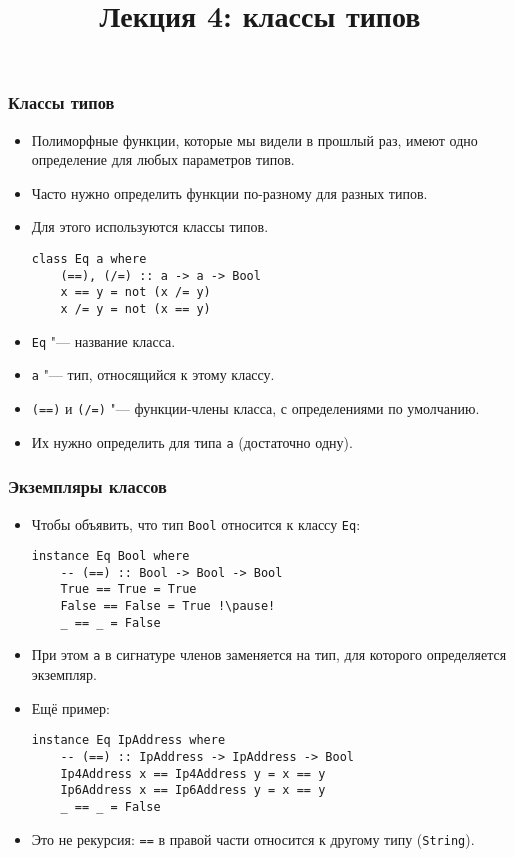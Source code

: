 \documentclass[10pt]{beamer}
\title{Лекция 4: классы типов}
\begin{document}
\begin{frame}[plain]
  \maketitle
\end{frame}

\begin{frame}[fragile]
  \frametitle{Классы типов}
  \begin{itemize}
    \item Полиморфные функции, которые мы видели в прошлый раз, имеют одно определение для любых параметров типов.
    \item Часто нужно определить функции по-разному для разных типов.
    \item Для этого используются классы типов.
          \begin{lstlisting}[basicstyle=\ttfamily\small]
class Eq a where
    (==), (/=) :: a -> a -> Bool
    x == y = not (x /= y)
    x /= y = not (x == y)
\end{lstlisting}
    \item \lstinline|Eq| "--- название класса.
    \item \lstinline|a| "--- тип, относящийся к этому классу.
    \item \lstinline|(==)| и \lstinline|(/=)| "--- функции-члены класса, с определениями по умолчанию.
    \item Их нужно определить для типа \lstinline|a| \pause(достаточно одну).
  \end{itemize}
\end{frame}

\begin{frame}[fragile]
  \frametitle{Экземпляры классов}
  \begin{itemize}
    \item Чтобы объявить, что тип \lstinline|Bool| относится к классу \lstinline|Eq|:
          \begin{lstlisting}[basicstyle=\ttfamily\small]
instance Eq Bool where
    -- (==) :: Bool -> Bool -> Bool
    True == True = True
    False == False = True !\pause!
    _ == _ = False
\end{lstlisting}
    \item При этом \lstinline|a| в сигнатуре членов заменяется на тип, для которого определяется экземпляр.
    \item Ещё пример:\pause
          \begin{lstlisting}[basicstyle=\ttfamily\small]
instance Eq IpAddress where
    -- (==) :: IpAddress -> IpAddress -> Bool
    Ip4Address x == Ip4Address y = x == y
    Ip6Address x == Ip6Address y = x == y
    _ == _ = False
\end{lstlisting}
    \item<4-> Это не рекурсия: \lstinline|==| в правой части относится к другому типу (\lstinline|String|).
  \end{itemize}
\end{frame}
\end{document}
